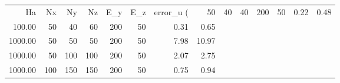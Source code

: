 \begin{tabular}{rrrrrrrr}
\toprule
Ha & Nx & Ny & Nz & E_y & E_z & error_u (%
 & 50 & 40 & 40 & 200 & 50 & 0.22 & 0.48 \\
100.00 & 50 & 40 & 60 & 200 & 50 & 0.31 & 0.65 \\
1000.00 & 50 & 50 & 50 & 200 & 50 & 7.98 & 10.97 \\
1000.00 & 50 & 100 & 100 & 200 & 50 & 2.07 & 2.75 \\
1000.00 & 100 & 150 & 150 & 200 & 50 & 0.75 & 0.94 \\
\bottomrule
\end{tabular}
